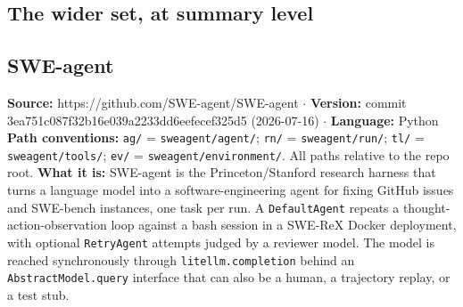 \subsection*{The wider set, at summary level}
\subsection{SWE-agent}

\textbf{Source:} https://github.com/SWE-agent/SWE-agent $\cdot$ \textbf{Version:} commit 3ea751c087f32b16e039a2233dd6eefecef325d5 (2026-07-16) $\cdot$ \textbf{Language:} Python
\textbf{Path conventions:} \texttt{ag/\allowbreak{}} = \texttt{sweagent/\allowbreak{}agent/\allowbreak{}}; \texttt{rn/\allowbreak{}} = \texttt{sweagent/\allowbreak{}run/\allowbreak{}}; \texttt{tl/\allowbreak{}} = \texttt{sweagent/\allowbreak{}tools/\allowbreak{}}; \texttt{ev/\allowbreak{}} = \texttt{sweagent/\allowbreak{}environment/\allowbreak{}}. All paths relative to the repo root.
\textbf{What it is:} SWE-agent is the Princeton/Stanford research harness that turns a language model into a software-engineering agent for fixing GitHub issues and SWE-bench instances, one task per run. A \texttt{DefaultAgent} repeats a thought-action-observation loop against a bash session in a SWE-ReX Docker deployment, with optional \texttt{RetryAgent} attempts judged by a reviewer model. The model is reached synchronously through \texttt{litellm.\allowbreak{}completion} behind an \texttt{AbstractModel.\allowbreak{}query} interface that can also be a human, a trajectory replay, or a test stub.

